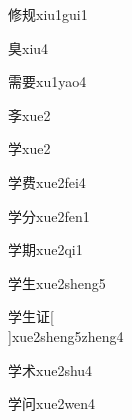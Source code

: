 \begin{verbete}[9;8]{修规}{xiu1gui1}
\end{verbete}

\begin{verbete}[10]{臭}{xiu4}
\end{verbete}

\begin{verbete}[14;9]{需要}{xu1yao4}
\end{verbete}

\begin{verbete}[7]{斈}{xue2}
\end{verbete}

\begin{verbete}[8]{学}{xue2}
\end{verbete}

\begin{verbete}[8;9]{学费}{xue2fei4}
\end{verbete}

\begin{verbete}[8;4]{学分}{xue2fen1}
\end{verbete}

\begin{verbete}[8;12]{学期}{xue2qi1}
\end{verbete}

\begin{verbete}[8;5]{学生}{xue2sheng5}
\end{verbete}

\begin{verbete}[8;5;7]{学生证}[\\]{xue2sheng5zheng4}
\end{verbete}

\begin{verbete}[8;5]{学术}{xue2shu4}
\end{verbete}

\begin{verbete}[8;6]{学问}{xue2wen4}
\end{verbete}

